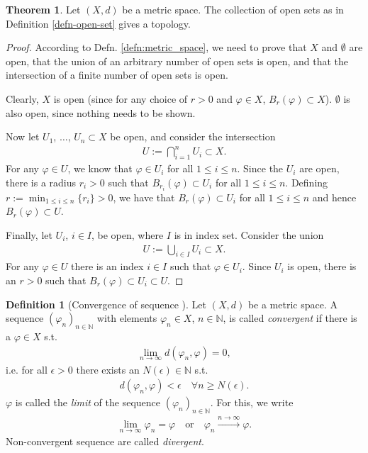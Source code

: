 \documentclass[12pt, a4paper]{article}
\numberwithin{equation}{section}
\theoremstyle{definition}
\theoremstyle{definition}
\newtheorem{defn}[thm]{Definition} %
\newtheorem{theorem}[thm]{Theorem}
\begin{document}
	\begin{theorem}
		Let $(X, d)$ be a metric space. The collection of open sets as in Definition \ref{defn-open-set} gives a topology.
	\end{theorem}
	\begin{proof}		
		According to Defn. \ref{defn:metric_space}, we need to prove that $X$ and $\emptyset$ are open, that the union of an arbitrary number of open sets is open, and that the intersection of a finite number of open sets is open. 
		
		Clearly, $X$ is open (since for any choice of $r > 0$ and $\varphi\in X$, $B_{r}(\varphi)\subset X$). $\emptyset$ is also open, since nothing needs to be shown.
		
		Now let $U_{1}$, $\dots$, $U_{n}\subset X$ be open, and consider the intersection
		\begin{align}
			U := \bigcap_{i=1}^{n}U_{i} \subset X.
		\end{align} 
		For any $\varphi\in U$, we know that $\varphi\in U_i$ for all $1\leq i \leq n$. Since the $U_{i}$ are open, there is a radius $r_{i} > 0$ such that $B_{r_i}(\varphi) \subset U_i$ for all $1\leq i \leq n$. Defining $r := \min_{1 \leq i \leq n}\{r_{i}\} > 0$, we have that $B_{r}(\varphi) \subset U_i$ for all $1\leq i\leq n$ and hence $B_{r}(\varphi)\subset U$.
		
		Finally, let $U_{i}$, $i\in I$, be open, where $I$ is in index set. Consider the union
		\begin{align}
			U := \bigcup_{i\in I}U_{i} \subset X.
		\end{align}
		For any $\varphi\in U$ there is an index $i\in I$ such that $\varphi\in U_i$. Since $U_i$ is open, there is an $r > 0$ such that $B_{r}(\varphi) \subset U_i \subset U$.
	\end{proof}

	\begin{defn}[Convergence of sequence \cite{fa2019}]\label{defn:convergence_sequence}
		Let $(X, d)$ be a metric space. A sequence $(\varphi_n)_{n\in\mathbb N}$ with elements $\varphi_n\in X$, $n\in\mathbb N$, is called \textit{convergent} if there is a $\varphi\in X$ s.t.
		\begin{align}
			\lim\limits_{n\to\infty}d(\varphi_n, \varphi) = 0,
		\end{align}
		i.e. for all $\epsilon > 0$ there exists an $N(\epsilon)\in\mathbb N$ s.t.
		\begin{align}
			d(\varphi_n, \varphi) < \epsilon \quad \forall n\geq N(\epsilon).
		\end{align}
		$\varphi$ is called the \textit{limit} of the sequence $(\varphi_n)_{n\in \mathbb N}$. For this, we write 
		\begin{align}
			\lim\limits_{n\to\infty}\varphi_n = \varphi \quad \text{or}\quad \varphi_n \overset{n \to\infty}{\longrightarrow} \varphi.
		\end{align}
		Non-convergent sequence are called \textit{divergent}.
	\end{defn}
\end{document}
